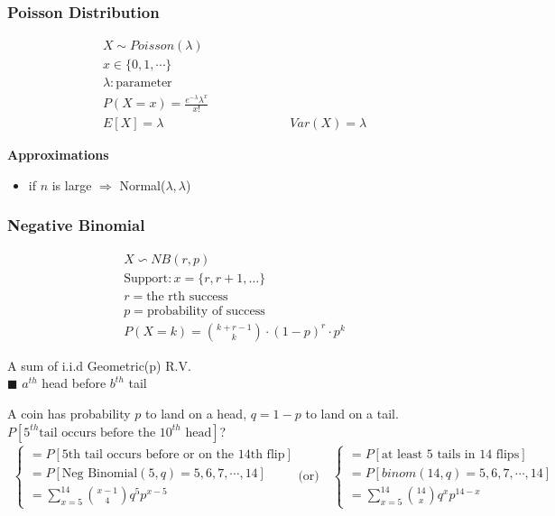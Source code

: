 \subsubsection*{Poisson Distribution}
\begin{tcolorbox}
\begin{gather*}
	X \sim Poisson(\lambda)\\
	 x \in \{0, 1, \cdots \} \\
	\lambda : \text{parameter}\\
	P(X = x) = \frac{e^{-\lambda} \lambda^x}{x!}\\
	E[X] = \lambda \hspace{10em} Var(X) = \lambda
\end{gather*}	
\end{tcolorbox}
\textbf{Approximations}
\begin{itemize}
	\item if $n$ is large $\Longrightarrow$ Normal($\lambda,\lambda$)
\end{itemize}
\subsubsection*{Negative Binomial}
\begin{tcolorbox}
	\begin{gather*}
	X \backsim NB(r,p)\\
	\text{Support}: x = \{ r, r+1, \ldots \}\\
	r = \text{the rth success}\\
	p = \text{probability of success}\\
	P(X = k) = \binom{k + r-1}{k} \cdot (1-p)^r \cdot p^k
 	\end{gather*}
\end{tcolorbox}
A sum of i.i.d Geometric(p) R.V.\\
$\blacksquare$ $a^{th}$ head before $b^{th}$ tail
\begin{example}
	A coin has probability $p$ to land on a head, $q = 1-p$ to land on a tail.\\
	$P[5^{th} \text{tail occurs before the } 10^{th} \text{ head}]$?
	\begin{gather*}
	\begin{cases}
		= P[\text{5th tail occurs before or on the 14th flip}]\\
		= P[\text{Neg Binomial}(5,q) = 5,6,7,\cdots, 14]\\
		= \sum\limits_{x=5}^{14} \binom{x-1}{4} q^5 p^{x-5}
	\end{cases}	\text{(or)} \quad
	\begin{cases}
		= P[\text{at least 5 tails in 14 flips}]\\
		= P[binom(14,q) = 5,6,7,\cdots, 14]\\
		= \sum\limits_{x=5}^{14} \binom{14}{x} q^x p^{14-x}
	\end{cases}
	\end{gather*}
\end{example}
